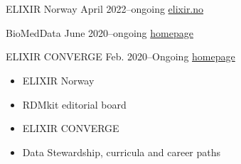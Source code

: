 \documentclass[10pt,a4paper,ragged2e,withhyper]{altacv}
\begin{document}
\begin{paracol}{2}








\\
\smallskip

\\
\smallskip

\cvtag{\TeX}



\cveventbis{}
        {ELIXIR Norway}
        {April 2022--ongoing}
        {
          \href{https://elixir.no/}
               {elixir.no}
        }

\cveventbis{}
        {BioMedData}
        {June 2020–ongoing}
        {
          \href{https://elixir.no/organization/biomeddata}
               {homepage}
        }

\cveventbis{}
        {ELIXIR CONVERGE}
        {Feb. 2020–Ongoing}
        {
          \href{https://elixir-europe.org/about-us/how-funded/eu-projects/converge}
               {homepage}
        }



        {
          \begin{itemize}
          \item ELIXIR Norway
          \item RDMkit editorial board
          \item ELIXIR CONVERGE
          \end{itemize}
        }
        {}{}


        {
          \begin{itemize}
          \item Data Stewardship, curricula and career paths
          \end{itemize}
        }
        {}{}


\end{paracol}
\end{document}
